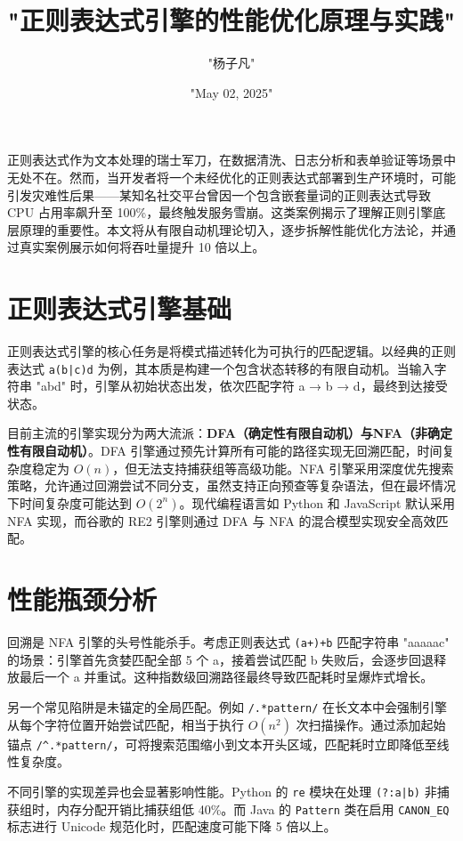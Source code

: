 \title{"正则表达式引擎的性能优化原理与实践"}
\author{"杨子凡"}
\date{"May 02, 2025"}
\maketitle
正则表达式作为文本处理的瑞士军刀，在数据清洗、日志分析和表单验证等场景中无处不在。然而，当开发者将一个未经优化的正则表达式部署到生产环境时，可能引发灾难性后果——某知名社交平台曾因一个包含嵌套量词的正则表达式导致 CPU 占用率飙升至 100\%{}，最终触发服务雪崩。这类案例揭示了理解正则引擎底层原理的重要性。本文将从有限自动机理论切入，逐步拆解性能优化方法论，并通过真实案例展示如何将吞吐量提升 10 倍以上。\par
\chapter{正则表达式引擎基础}
正则表达式引擎的核心任务是将模式描述转化为可执行的匹配逻辑。以经典的正则表达式 \verb!a(b|c)d! 为例，其本质是构建一个包含状态转移的有限自动机。当输入字符串 "abd" 时，引擎从初始状态出发，依次匹配字符 a → b → d，最终到达接受状态。\par
目前主流的引擎实现分为两大流派：\textbf{DFA（确定性有限自动机）\textbf{与}NFA（非确定性有限自动机）}。DFA 引擎通过预先计算所有可能的路径实现无回溯匹配，时间复杂度稳定为 $O(n)$，但无法支持捕获组等高级功能。NFA 引擎采用深度优先搜索策略，允许通过回溯尝试不同分支，虽然支持正向预查等复杂语法，但在最坏情况下时间复杂度可能达到 $O(2^n)$。现代编程语言如 Python 和 JavaScript 默认采用 NFA 实现，而谷歌的 RE2 引擎则通过 DFA 与 NFA 的混合模型实现安全高效匹配。\par
\chapter{性能瓶颈分析}
回溯是 NFA 引擎的头号性能杀手。考虑正则表达式 \verb!(a+)+b! 匹配字符串 "aaaaac" 的场景：引擎首先贪婪匹配全部 5 个 a，接着尝试匹配 b 失败后，会逐步回退释放最后一个 a 并重试。这种指数级回溯路径最终导致匹配耗时呈爆炸式增长。\par
另一个常见陷阱是未锚定的全局匹配。例如 \verb!/.*pattern/! 在长文本中会强制引擎从每个字符位置开始尝试匹配，相当于执行 $O(n^2)$ 次扫描操作。通过添加起始锚点 \verb!/^.*pattern/!，可将搜索范围缩小到文本开头区域，匹配耗时立即降低至线性复杂度。\par
不同引擎的实现差异也会显著影响性能。Python 的 \verb!re! 模块在处理 \verb!(?:a|b)! 非捕获组时，内存分配开销比捕获组低 40\%{}。而 Java 的 \verb!Pattern! 类在启用 \verb!CANON_EQ! 标志进行 Unicode 规范化时，匹配速度可能下降 5 倍以上。\par
